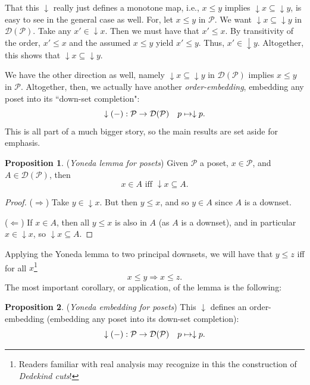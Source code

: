 \documentclass[a4paper]{book}
\theoremstyle{definition}
\theoremstyle{definition}
\theoremstyle{definition}
\newtheorem{proposition}{Proposition}[section]
\theoremstyle{theorem}
\theoremstyle{definition}
\begin{document}
 That this $\downarrow$ really just defines a monotone map, i.e., $x \leq y$ implies $\downarrow x \subseteq  \downarrow y$, is easy to see in the general case as well. For, let $x \leq y$ in $\mathcal{P}$. We want $\downarrow x \subseteq  \downarrow y$ in $\mathcal{D}(\mathcal{P})$. Take any $x' \in \downarrow x$. Then we must have that $x' \leq x$. By transitivity of the order, $x' \leq x$ and the assumed $x \leq y$ yield $x' \leq y$. Thus, $x' \in \downarrow y$. Altogether, this shows that $\downarrow x \subseteq  \downarrow y$. \par 
 We have the other direction as well, namely $\downarrow x \subseteq  \downarrow y$ in $\mathcal{D}(\mathcal{P})$ implies $x \leq y$ in $\mathcal{P}$. Altogether, then, we actually have another \textit{order-embedding}, embedding any poset into its ``down-set completion":
\begin{equation}
\downarrow(\--): \mathcal{P} \rightarrow \mathcal{D}(\mathcal{P}) \hspace*{1em}
p \mapsto \downarrow p . 
\end{equation}  
This is all part of a much bigger story, so the main results are set aside for emphasis.
\begin{proposition}
	(\textit{Yoneda lemma for posets})  Given $\mathcal{P}$ a poset, $x \in \mathcal{P}$, and $A \in \mathcal{D}(\mathcal{P})$, then 
	\begin{equation*}
	x \in A \text{ iff } \downarrow x \subseteq  A. 
	\end{equation*}
\end{proposition}
\begin{proof}
	($\Rightarrow$) Take $y \in \downarrow x$. But then $y \leq x$, and so $y \in A$ since $A$ is a downset. \par \noindent 
	($\Leftarrow$) If $x \in A$, then all $y \leq x$ is also in $A$ (as $A$ is a downset), and in particular $x \in \downarrow x$, so $\downarrow x \subseteq  A$.
\end{proof} \noindent 
Applying the Yoneda lemma to two principal downsets, we will have that $y \leq z$ iff for all $x$\footnote{Readers familiar with real analysis may recognize in this the construction of \textit{Dedekind cuts}!}
\begin{equation*}
x \leq y \Rightarrow x \leq z. 
\end{equation*} 
The most important corollary, or application, of the lemma is the following: 
\begin{proposition}
	(\textit{Yoneda embedding for posets})  This $\downarrow$ defines an order-embedding (embedding any poset into its down-set completion): 
	\begin{equation}
	\downarrow(\--): \mathcal{P} \rightarrow \mathcal{D}(\mathcal{P}) \hspace*{1em}
	p \mapsto \downarrow p.  
	\end{equation}  
\end{proposition}
\end{document}
